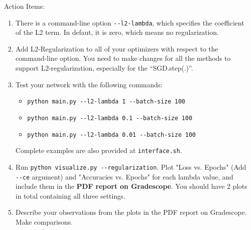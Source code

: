 \noindent Action Items:
\begin{enumerate}
\item There is a command-line option \verb|--l2-lambda|, which specifies the coefficient of the L2 term. In defaut, it is zero, which means no regularization.

\item Add L2-Regularization to all of your optimizers with respect to the command-line option. You need to make changes for all the methods to support L2-regularization, especially for the ``SGD.step(.)''.

\item Test your network with the following commands:
    \begin{itemize}
    \item \verb|python main.py --l2-lambda 1 --batch-size 100|
    \item \verb|python main.py --l2-lambda 0.1 --batch-size 100|
    \item \verb|python main.py --l2-lambda 0.01 --batch-size 100|
    \end{itemize}
Complete examples are also provided at \texttt{interface.sh}.

\item Run \verb|python visualize.py --regularization|. Plot "Loss vs. Epochs" (Add \verb|--ce| argument) and "Accuracies vs. Epochs" for each lambda value, and include them in the {\bf PDF report on Gradescope}. You should have 2 plots in total containing all three settings.

\item Describe your observations from the plots in the PDF report on Gradescope. Make comparisons.

\end{enumerate}




